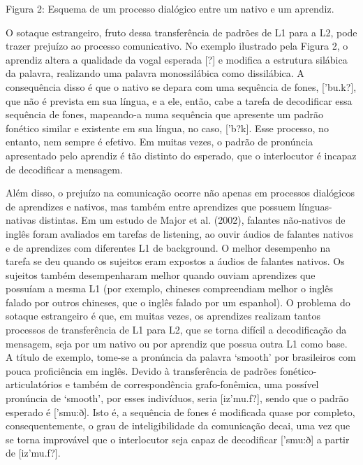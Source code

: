 Figura 2: Esquema de um processo dial\'ogico entre um nativo e um
aprendiz.

O sotaque estrangeiro, fruto dessa transfer\^encia de padr\~oes de L1 para a
L2, pode trazer preju\'izo ao processo comunicativo. No exemplo ilustrado
pela Figura 2, o aprendiz altera a qualidade da vogal esperada {[}?{]} e
modifica a estrutura sil\'abica da palavra, realizando uma palavra
monossil\'abica como dissil\'abica. A consequ\^encia disso \'e que o nativo se
depara com uma sequ\^encia de fones, {[}'bu.k?{]}, que n\~ao \'e prevista em
sua l\'ingua, e a ele, ent\~ao, cabe a tarefa de decodificar essa sequ\^encia
de fones, mapeando-a numa sequ\^encia que apresente um padr\~ao fon\'etico
similar e existente em sua l\'ingua, no caso, {[}'b?k{]}. Esse processo,
no entanto, nem sempre \'e efetivo. Em muitas vezes, o padr\~ao de pron\'uncia
apresentado pelo aprendiz \'e t\~ao distinto do esperado, que o interlocutor
\'e incapaz de decodificar a mensagem.

Al\'em disso, o preju\'izo na comunica\c{c}\~ao ocorre n\~ao apenas em processos
dial\'ogicos de aprendizes e nativos, mas tamb\'em entre aprendizes que
possuem l\'inguas-nativas distintas. Em um estudo de Major et al. (2002),
falantes n\~ao-nativos de ingl\^es foram avaliados em tarefas de listening,
ao ouvir \'audios de falantes nativos e de aprendizes com diferentes L1 de
background. O melhor desempenho na tarefa se deu quando os sujeitos eram
expostos a \'audios de falantes nativos. Os sujeitos tamb\'em desempenharam
melhor quando ouviam aprendizes que possu\'iam a mesma L1 (por exemplo,
chineses compreendiam melhor o ingl\^es falado por outros chineses, que o
ingl\^es falado por um espanhol). O problema do sotaque estrangeiro \'e que,
em muitas vezes, os aprendizes realizam tantos processos de
transfer\^encia de L1 para L2, que se torna dif\'icil a decodifica\c{c}\~ao da
mensagem, seja por um nativo ou por aprendiz que possua outra L1 como
base. A t\'itulo de exemplo, tome-se a pron\'uncia da palavra `smooth' por
brasileiros com pouca profici\^encia em ingl\^es. Devido à transfer\^encia de
padr\~oes fon\'etico-articulat\'orios e tamb\'em de correspond\^encia
grafo-fon\^emica, uma poss\'ivel pron\'uncia de `smooth', por esses
indiv\'iduos, seria {[}iz'mu.f?{]}, sendo que o padr\~ao esperado \'e
{[}'smu:ð{]}. Isto \'e, a sequ\^encia de fones \'e modificada quase por
completo, consequentemente, o grau de inteligibilidade da comunica\c{c}\~ao
decai, uma vez que se torna improv\'avel que o interlocutor seja capaz de
decodificar {[}'smu:ð{]} a partir de {[}iz'mu.f?{]}.

